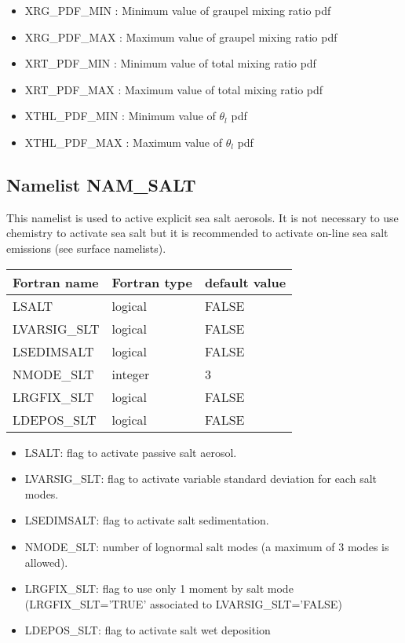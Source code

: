 \begin{itemize}
\item
XRG\_PDF\_MIN : Minimum value of graupel mixing ratio pdf

\item
XRG\_PDF\_MAX : Maximum value of graupel mixing ratio pdf

\item
XRT\_PDF\_MIN : Minimum value of total mixing ratio pdf

\item
XRT\_PDF\_MAX : Maximum value of total mixing ratio pdf

\item
XTHL\_PDF\_MIN : Minimum value of $\theta_l$ pdf

\item
XTHL\_PDF\_MAX : Maximum value of $\theta_l$ pdf

\end{itemize}
\subsection{Namelist NAM\_SALT }
%
This namelist is used to active explicit sea salt aerosols. 
It is not necessary to use chemistry to activate sea salt but it is recommended to activate on-line sea salt emissions (see surface namelists).


\begin{center}
\begin{tabular} {|l|l|l|}
\hline
Fortran name & Fortran type & default value \\
\hline
LSALT       & logical  & FALSE  \\
LVARSIG\_SLT& logical  & FALSE  \\
LSEDIMSALT  & logical  & FALSE  \\
NMODE\_SLT  & integer  &  3  \\
LRGFIX\_SLT & logical  & FALSE  \\
LDEPOS\_SLT & logical  & FALSE  \\
\hline
\end{tabular}
\end{center}

\begin{itemize}

\item LSALT: flag to activate passive salt aerosol.
\item LVARSIG\_SLT: flag to activate variable standard deviation for each salt modes.
\item LSEDIMSALT: flag to activate salt sedimentation.
\item  NMODE\_SLT: number of lognormal salt modes (a maximum of 3 modes is allowed).
\item LRGFIX\_SLT: flag to use only 1 moment by salt mode (LRGFIX\_SLT='TRUE' associated to LVARSIG\_SLT='FALSE)
\item LDEPOS\_SLT: flag to activate salt wet deposition  
\end{itemize}
